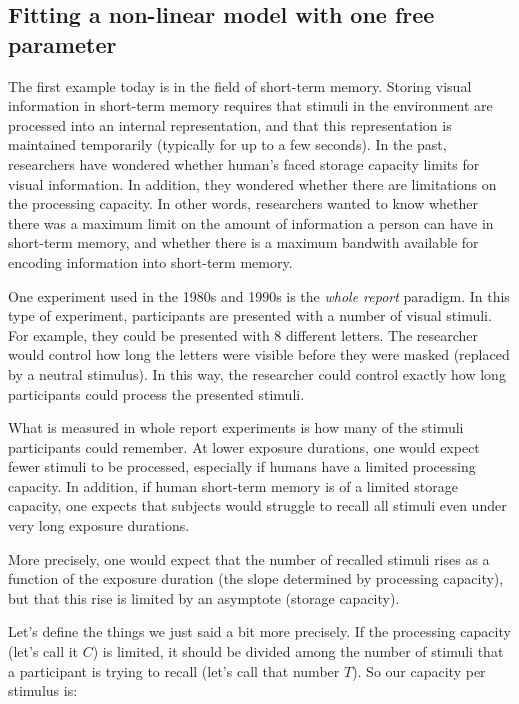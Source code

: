 \documentclass[11pt]{article}
\begin{document}
    \subsection{Fitting a non-linear model with one free
parameter}\label{fitting-a-non-linear-model-with-one-free-parameter}

The first example today is in the field of short-term memory. Storing
visual information in short-term memory requires that stimuli in the
environment are processed into an internal representation, and that this
representation is maintained temporarily (typically for up to a few
seconds). In the past, researchers have wondered whether human's faced
storage capacity limits for visual information. In addition, they
wondered whether there are limitations on the processing capacity. In
other words, researchers wanted to know whether there was a maximum
limit on the amount of information a person can have in short-term
memory, and whether there is a maximum bandwith available for encoding
information into short-term memory.

One experiment used in the 1980s and 1990s is the \emph{whole report}
paradigm. In this type of experiment, participants are presented with a
number of visual stimuli. For example, they could be presented with 8
different letters. The researcher would control how long the letters
were visible before they were masked (replaced by a neutral stimulus).
In this way, the researcher could control exactly how long participants
could process the presented stimuli.

What is measured in whole report experiments is how many of the stimuli
participants could remember. At lower exposure durations, one would
expect fewer stimuli to be processed, especially if humans have a
limited processing capacity. In addition, if human short-term memory is
of a limited storage capacity, one expects that subjects would struggle
to recall all stimuli even under very long exposure durations.

More precisely, one would expect that the number of recalled stimuli
rises as a function of the exposure duration (the slope determined by
processing capacity), but that this rise is limited by an asymptote
(storage capacity).

Let's define the things we just said a bit more precisely. If the
processing capacity (let's call it \(C\)) is limited, it should be
divided among the number of stimuli that a participant is trying to
recall (let's call that number \(T\)). So our capacity per stimulus is:
\end{document}
